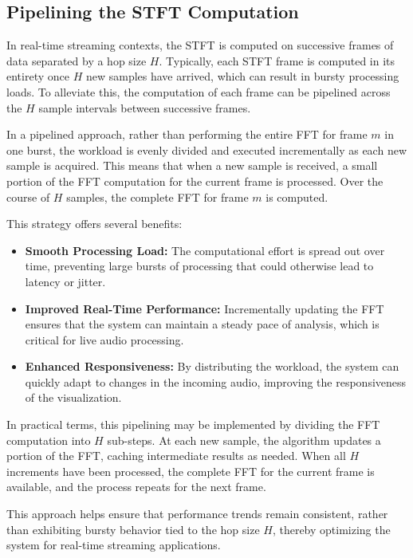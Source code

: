 \documentclass[12pt,letter]{article}
\begin{document}
\subsection{Pipelining the STFT Computation}

In real-time streaming contexts, the STFT is computed on successive frames of
data separated by a hop size $H$. Typically, each STFT frame is computed
in its entirety once $H$ new samples have arrived, which can result in
bursty processing loads. To alleviate this, the computation of each frame can
be pipelined across the $H$ sample intervals between successive frames.

In a pipelined approach, rather than performing the entire FFT for frame
$m$ in one burst, the workload is evenly divided and executed
incrementally as each new sample is acquired. This means that when a new
sample is received, a small portion of the FFT computation for the current
frame is processed. Over the course of $H$ samples, the complete FFT for
frame $m$ is computed.

This strategy offers several benefits:
\begin{itemize}
  \item \textbf{Smooth Processing Load:} The computational effort is spread
  out over time, preventing large bursts of processing that could otherwise
  lead to latency or jitter.
  \item \textbf{Improved Real-Time Performance:} Incrementally updating the
  FFT ensures that the system can maintain a steady pace of analysis, which
  is critical for live audio processing.
  \item \textbf{Enhanced Responsiveness:} By distributing the workload, the
  system can quickly adapt to changes in the incoming audio, improving the
  responsiveness of the visualization.
\end{itemize}

In practical terms, this pipelining may be implemented by dividing the FFT
computation into $H$ sub-steps. At each new sample, the algorithm updates
a portion of the FFT, caching intermediate results as needed. When all
$H$ increments have been processed, the complete FFT for the current
frame is available, and the process repeats for the next frame.

This approach helps ensure that performance trends remain consistent, rather
than exhibiting bursty behavior tied to the hop size $H$, thereby
optimizing the system for real-time streaming applications.


\clearpage
\finalPage
\end{document}

